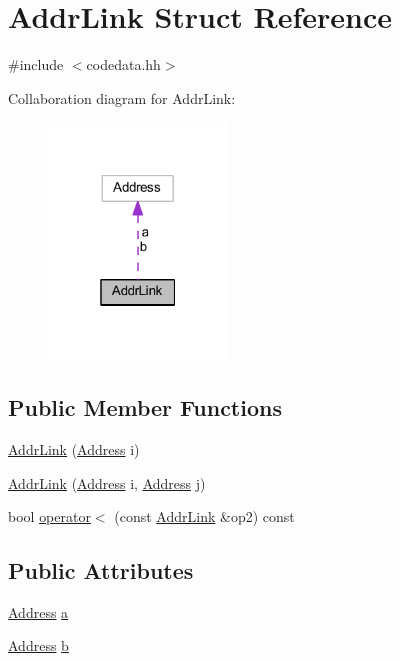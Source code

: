 \hypertarget{struct_addr_link}{}\section{Addr\+Link Struct Reference}
\label{struct_addr_link}


{\ttfamily \#include $<$codedata.\+hh$>$}



Collaboration diagram for Addr\+Link\+:
\nopagebreak
\begin{figure}[H]
\begin{center}
\leavevmode
\includegraphics[width=135pt]{struct_addr_link__coll__graph}
\end{center}
\end{figure}
\subsection*{Public Member Functions}
\begin{DoxyCompactItemize}
\item 
\mbox{\hyperlink{struct_addr_link_a801a20cc2cf34031ff767da3f343cea7}{Addr\+Link}} (\mbox{\hyperlink{class_address}{Address}} i)
\item 
\mbox{\hyperlink{struct_addr_link_ad7f2849ca3127793e2c0f08e23721992}{Addr\+Link}} (\mbox{\hyperlink{class_address}{Address}} i, \mbox{\hyperlink{class_address}{Address}} j)
\item 
bool \mbox{\hyperlink{struct_addr_link_a4852a9dac537d11998b55bfa01261552}{operator$<$}} (const \mbox{\hyperlink{struct_addr_link}{Addr\+Link}} \&op2) const
\end{DoxyCompactItemize}
\subsection*{Public Attributes}
\begin{DoxyCompactItemize}
\item 
\mbox{\hyperlink{class_address}{Address}} \mbox{\hyperlink{struct_addr_link_a6ec67c67d0ffaad063b5513686591a31}{a}}
\item 
\mbox{\hyperlink{class_address}{Address}} \mbox{\hyperlink{struct_addr_link_a1489f3ae0ae7b38b92fdfaac31285a41}{b}}
\end{DoxyCompactItemize}


